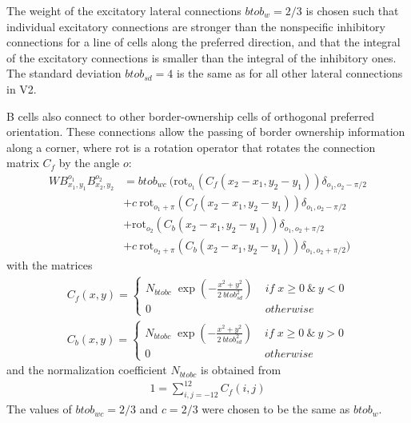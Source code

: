 The weight of the excitatory lateral connections $btob_w=2/3$ is
chosen such that individual excitatory connections are stronger than
the nonspecific inhibitory connections for a line of cells along the
preferred direction, 
and that the integral of the excitatory connections is smaller than
the integral of the inhibitory ones. The standard deviation
$btob_{sd}=4$ is the same as for all other lateral connections in V2.  

B cells also connect to other border-ownership cells of orthogonal preferred
orientation. These connections allow the passing of border ownership
information along a corner, where rot is a rotation operator that rotates the connection matrix $C_f$ by the angle $o$:
\begin{align}
	WB^{o_1}_{x_1,y_1}B^{o_2}_{x_2,y_2}&=btob_{wc}\: (\text{rot}_{o_1}(C_f(x_2-x_1,y_2-y_1)) \delta_{o_1,o_2-\pi/2} \\\nonumber
	&+c\:\text{rot}_{o_1+\pi}(C_f(x_2-x_1,y_2-y_1)) \delta_{o_1,o_2-\pi/2} \\\nonumber
	&+\text{rot}_{o_2}(C_b(x_2-x_1,y_2-y_1)) \delta_{o_1,o_2+\pi/2} \\\nonumber
	&+c\:\text{rot}_{o_2+\pi}(C_b(x_2-x_1,y_2-y_1)) \delta_{o_1,o_2+\pi/2} )
\end{align}
with the matrices
\begin{align}
	C_f(x,y)=
	\begin{cases}
	N_{btobc}\;\exp(-\frac{x^2+y^2}{2\:btob_{sd}^2})\;&if\;x\geq0\:\&\:y<0\\
	0\;&otherwise
	\end{cases}\\
	C_b(x,y)=
	\begin{cases}
	N_{btobc}\;\exp(-\frac{x^2+y^2}{2\:btob_{sd}^2})\;&if\;x\geq0\:\&\:y>0\\
	0\;&otherwise
	\end{cases}
\end{align}
and the normalization coefficient $N_{btobc}$ is obtained from
\begin{align}
1=\sum^{12}_{i,j=-12} C_f(i,j)
\end{align}
The values of $btob_{wc}=2/3$ and $c=2/3$ were chosen to be the same as $btob_w$.

